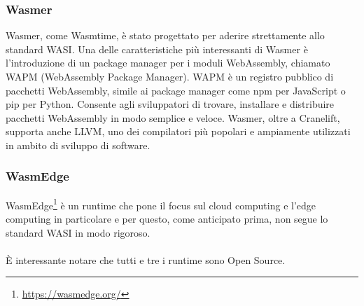 \subsubsection{Wasmer}
Wasmer, come Wasmtime, è stato progettato per aderire strettamente allo standard WASI. Una delle caratteristiche più
interessanti di Wasmer è l'introduzione di un package manager per i moduli WebAssembly, chiamato WAPM (WebAssembly
Package Manager). WAPM è un registro pubblico di pacchetti WebAssembly, simile ai package manager come npm per
JavaScript o pip per Python. Consente agli sviluppatori di trovare, installare e distribuire pacchetti WebAssembly in
modo semplice e veloce. Wasmer, oltre a Cranelift, supporta anche LLVM, uno dei compilatori più popolari e ampiamente
utilizzati in ambito di sviluppo di software.

\subsubsection{WasmEdge}
WasmEdge\footnote{\url{https://wasmedge.org/}} è un runtime che pone il focus sul cloud computing e l'edge computing in
particolare e per questo, come anticipato prima, non segue lo standard WASI in modo rigoroso. \\
\\
È interessante notare che tutti e tre i runtime sono Open Source.
